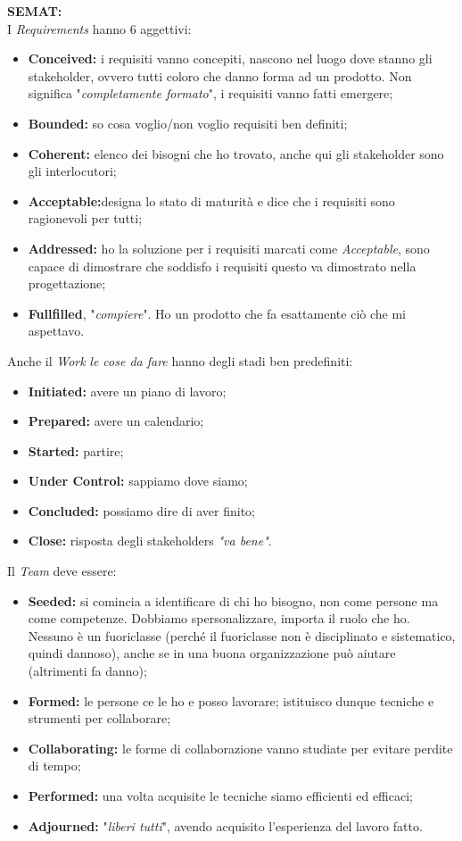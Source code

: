 \textbf{SEMAT:} \\
I \textit{Requirements} hanno 6 aggettivi:
\begin{itemize}
	\item \textbf{Conceived:} i requisiti vanno concepiti, nascono nel luogo dove stanno gli stakeholder, ovvero tutti coloro che danno forma ad un prodotto. Non significa "\textit{completamente formato}", i requisiti vanno fatti emergere;
	\item \textbf{Bounded:} so cosa voglio/non voglio requisiti ben definiti;
	\item \textbf{Coherent:} elenco dei bisogni che ho trovato, anche qui gli stakeholder sono gli interlocutori;
	\item \textbf{Acceptable:}designa lo stato di maturità e dice che i requisiti sono ragionevoli per tutti;
	\item \textbf{Addressed:} ho la soluzione per i requisiti marcati come \textit{Acceptable}, sono capace di dimostrare che soddisfo i requisiti questo va dimostrato nella progettazione;
	\item \textbf{Fullfilled}, "\textit{compiere}". Ho un prodotto che fa esattamente ciò che mi aspettavo.	\end{itemize}
	
Anche il \textit{Work} \textit{le cose da fare} hanno degli stadi ben predefiniti:
\begin{itemize}
	\item \textbf{Initiated:} avere un piano di lavoro;
	\item \textbf{Prepared:} avere un calendario;
	\item \textbf{Started:} partire;
	\item \textbf{Under Control:} sappiamo dove siamo;
	\item \textbf{Concluded:} possiamo dire di aver finito;
	\item \textbf{Close:} risposta degli stakeholders \textit{"va bene"}.
\end{itemize}
Il \textit{Team} deve essere:
\begin{itemize}
	\item \textbf{Seeded:} si comincia a identificare di chi ho bisogno, non come persone ma come competenze. Dobbiamo spersonalizzare, importa il ruolo che ho. Nessuno è un fuoriclasse (perché il fuoriclasse non è disciplinato e sistematico, quindi dannoso), anche se in una buona organizzazione può aiutare (altrimenti fa danno);
	\item \textbf{Formed:} le persone ce le ho e posso lavorare; istituisco dunque tecniche e strumenti per collaborare;
	\item \textbf{Collaborating:} le forme di collaborazione vanno studiate per evitare perdite di tempo;
	\item \textbf{Performed:} una volta acquisite le tecniche siamo efficienti ed efficaci;
	\item \textbf{Adjourned:} "\textit{liberi tutti}", avendo acquisito l'esperienza del lavoro fatto.
\end{itemize}
